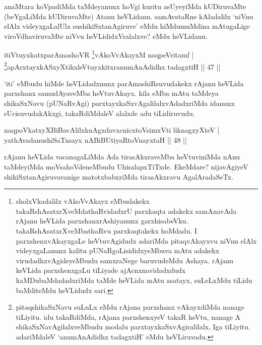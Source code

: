 \begin{artha}
anaMtara koVpadiMda taMdeyanunx hoVgi kuritu asUyeyiMda kUDiruvaMte 
(beYgaLiMda kUDiruvaMte) Atanu heVLidanu. samAvataRne kAladalilx 
`niVnu elAlx videyxgaLalUlx sushikiSxtanAgiruve' eMdu hiMdumuMdina 
mAtugaLige viroVdhaviruvaMte niVvu heVLididxVralalxve? eMdu heVLidanu.
\end{artha}



\begin{shl}
itiVtuyxkatxparAmashoVR \footnote{sholxVkadalilx vAkoVvAkayx eMbudakekx  takaRshAsatxrXveMdathaRvidadxrU parxkaqta adakekx samAnavAda rAjanu  heVLida parxshanxrAshiyanunx garxhisabeVku. takaRshAsatxrXveMbathaRvu  parxkaqtakekx hoMdadu. I parxshenxvAkayxgaLe heVtuvAgidudx adariMda  pitaqvAkayxvu niVnu elAlx videyxgaLanunx kalitu  pUNaRgoLisididxyeMbuva mAtu adakekx virudadhxvAgideyeMbudu samxraNege  baruvudeMdu Ashaya. rAjanu keVLida parxshenxgaLu tiLiyade  ajAcnxnavidadxdudx kaMDubaMdadadxriMda taMde heVLida mAtu asatayx,  suLeLxMdu tiLidu baMditeMdu heVLidudx sari.}vAkoVvAkayxM naqpeVritamf | \\
\footnote{pitaqshikaSxNavu suLuLx eMdu rAjana parxshanx vAkayxdiMda  nanage tiLiyitu. idu takaRdiMda, rAjana parxshenxyeV takaR heVtu,  nanage A shikaSxNavAgilalxveMbudu modalu parxtayxkaSxvAgiralilalx, Iga  tiLiyitu. adariMdaleV `anumAnAdidhx tadagxtiH' eMdu heVLiruvadu.}apArxtayxkASxyXtikxleVtuyxkitxranumAnAdidhx tadagxtiH \hfill|| 47 || 
\end{shl}


\begin{artha}
`iti' eMbudu hiMde heVLidadxnunx parAmashiRsuvudakekx rAjanu heVLida 
parxshanx samudAyaveMba heVtuvAkayx. kila eMba mAtu taMdeya 
shikaSxNavu (pUNaRvAgi) parxtayxkaSxvAgalilalxvAdadxriMda idanunx
sUcisuvudakAkxgi, takaRdiMdaleV alalxde adu tiLidiruvudu.
\end{artha}

\begin{shl}
naqpoVkatxyXBiBavAlilxknAgxdavxcnicxtoV\s simxVti liknagxyXteV | \\
yathAvadanushiSaTxsayx nABiBUtiyaRtoV\s nayxtaH \hfill|| 48 || 
\end{shl}

\begin{artha}
rAjanu heVLida vacanagaLiMda Ada tirasAkxraveMba heVtuviniMda 
nAnu taMdeyiMda moVsahoVdeneMbudu UhisalapxTiTxde. EkeMdare? 
nijavAgiyeV shikiSxtanAgiruvavanige matotxbabxriMda tirasAkxravu 
AgalAradaSeTx.
\end{artha}

